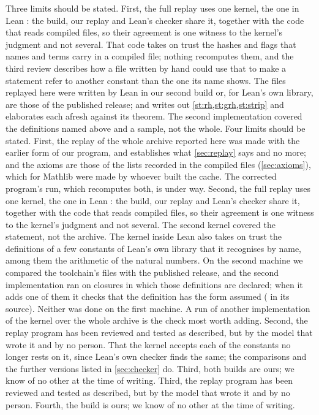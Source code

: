\ifsecondrun
Three limits should be stated. First, the full replay uses one kernel, the one in Lean
\leanversion{}: the build, our replay and Lean's checker share it, together with the code
that reads compiled files, so their agreement is one witness to the kernel's judgment and not
several. That code takes on trust the hashes and flags that names and terms carry in a
compiled file; nothing recomputes them, and the third review describes how a file written
by hand could use that to make a statement refer to another constant than the one its name
shows. The files replayed here were written by Lean in our second build or, for Lean's own
library, are those of the published release; and  writes out
\cref{st:rh,st:grh,st:strip} and elaborates each afresh against its theorem. The second
implementation covered the definitions named above and a sample, not the whole.
\else
Four limits should be stated. First, the replay of the whole archive reported here was made
with the earlier form of our program, and establishes what \cref{sec:replay} says and no
more; and the axioms are those of the lists recorded in the compiled files
(\cref{sec:axioms}), which for Mathlib were made by whoever built the cache. The
corrected program's run, which recomputes both, is under way. Second, the full replay uses
one kernel, the
one in Lean \leanversion{}: the build, our replay and Lean's checker share it, together with
the code that reads compiled files, so their agreement is one witness to the kernel's
judgment and not several. The second kernel covered the statement, not the archive.
\fi
The kernel
inside Lean also takes on trust the definitions of a few constants of Lean's own library that
it recognises by name, among them the arithmetic of the natural numbers. On the second
machine we compared the toolchain's files with the published release, and the second
implementation ran on closures in which those definitions are declared; when it adds one
of them it checks that the definition has the form assumed ( in its
source). Neither was done on the first machine. A run of another implementation of the
kernel over the whole archive is the check most worth adding.
\ifsecondrun
Second, the replay program has been reviewed and tested as
described, but by the model that wrote it and by no person. That the kernel accepts each of
the \replaydecls{} constants no longer rests on it, since Lean's own checker finds the same;
the comparisons and the further versions listed in \cref{sec:checker} do. Third, both builds are ours; we
know of no other at the time of writing.
\else
Third, the replay program has been reviewed and tested as described, but by the model that
wrote it and by no person. Fourth, the build is ours; we know of no other at the time of
writing.
\fi
